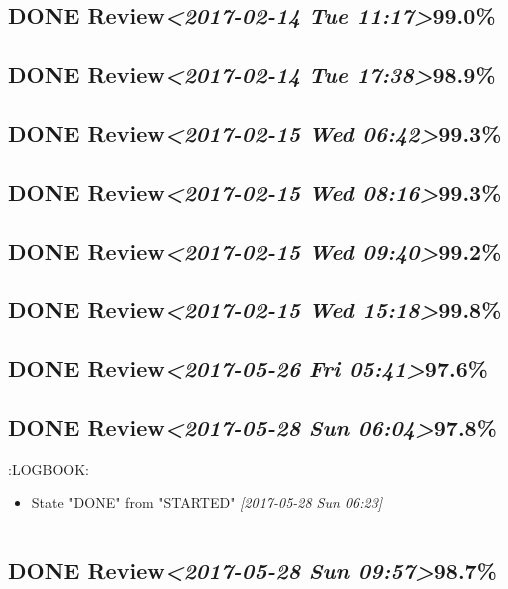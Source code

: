 \documentclass[11pt]{ctexart}
\begin{document}
\subsection{{\bfseries\sffamily DONE} Review\textit{<2017-02-14 Tue 11:17>}99.0\%}
\label{sec:org780fcdc}
\subsection{{\bfseries\sffamily DONE} Review\textit{<2017-02-14 Tue 17:38>}98.9\%}
\label{sec:org4e8c213}
\subsection{{\bfseries\sffamily DONE} Review\textit{<2017-02-15 Wed 06:42>}99.3\%}
\label{sec:orge2517d4}
\subsection{{\bfseries\sffamily DONE} Review\textit{<2017-02-15 Wed 08:16>}99.3\%}
\label{sec:org8e8d493}
\subsection{{\bfseries\sffamily DONE} Review\textit{<2017-02-15 Wed 09:40>}99.2\%}
\label{sec:org9ec03c4}
\subsection{{\bfseries\sffamily DONE} Review\textit{<2017-02-15 Wed 15:18>}99.8\%}
\label{sec:orgb118bd5}
\subsection{{\bfseries\sffamily DONE} Review\textit{<2017-05-26 Fri 05:41>}97.6\%}
\label{sec:org953921d}
\subsection{{\bfseries\sffamily DONE} Review\textit{<2017-05-28 Sun 06:04>}97.8\%}
\label{sec:orgdbd7860}
:LOGBOOK:
\begin{itemize}
\item State "DONE"       from "STARTED"    \textit{[2017-05-28 Sun 06:23]}
\end{itemize}
\begin{verbatim}

\end{verbatim}
\subsection{{\bfseries\sffamily DONE} Review\textit{<2017-05-28 Sun 09:57>}98.7\%}
\label{sec:orgea4999e}
\end{document}
